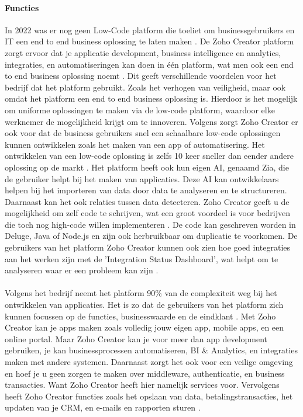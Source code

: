 \paragraph{Functies}
In 2022 was er nog geen Low-Code platform die toeliet om businessgebruikers en IT een end to end business oplossing te laten maken \autocite{Computer2022}.
De Zoho Creator platform zorgt ervoor dat je applicatie development, business intelligence en analytics, integraties, en automatiseringen kan doen in één platform, wat men ook een end to end business oplossing noemt \autocite{Computer2022}.
Dit geeft verschillende voordelen voor het bedrijf dat het platform gebruikt. Zoals het verhogen van veiligheid, maar ook omdat het platform een end to end business oplossing is. Hierdoor is het mogelijk om uniforme oplossingen te maken via de low-code platform,
waardoor elke werknemer de mogelijkheid krijgt om te innoveren. Volgens \textcite{Computer2022} zorgt Zoho Creator er ook voor dat de business gebruikers snel een schaalbare low-code oplossingen kunnen ontwikkelen zoals het maken van een app of automatisering.
Het ontwikkelen van een low-code oplossing is zelfs 10 keer sneller dan eender andere oplossing op de markt \autocite{Computer2022}. Het platform heeft ook hun eigen AI, genaamd Zia, die de gebruiker helpt bij het maken van applicaties. Deze AI
kan ontwikkelaars helpen bij het importeren van data door data te analyseren en te structureren. Daarnaast kan het ook relaties tussen data detecteren. 
Zoho Creator geeft u de mogelijkheid om zelf code te schrijven, wat een groot voordeel is voor bedrijven die toch nog high-code willen implementeren \autocite{Computer2022}. 
De code kan geschreven worden in Deluge, Java of Node.js en zijn ook herbruikbaar om duplicatie te voorkomen.
De gebruikers van het platform Zoho Creator kunnen ook zien hoe goed integraties aan het werken zijn met de 'Integration Status Dashboard', wat helpt om te analyseren waar er een probleem kan zijn \autocite{Computer2022}.
\\ %
\\
Volgens het bedrijf \textcite{ZohoCorporation2024b} neemt het platform 90\% van de complexiteit weg bij het ontwikkelen van applicaties. Het is zo dat de gebruikers van het platform
zich kunnen focussen op de functies, businesswaarde en de eindklant \autocite{ZohoCorporation2024b}.  Met Zoho Creator kan je apps maken zoals volledig jouw eigen app, mobile apps, en een online portal.
Maar Zoho Creator kan je voor meer dan app development gebruiken, je kan businessprocessen automatiseren, BI \& Analytics, en integraties maken met andere systemen. Daarnaast zorgt het ook voor een veilige omgeving en hoef je u geen zorgen 
te maken over middleware, authenticatie, en business transacties. Want Zoho Creator heeft hier namelijk services voor. Vervolgens heeft Zoho Creator functies zoals het opslaan van data,
betalingstransacties, het updaten van je CRM, en e-mails en rapporten sturen \autocite{ZohoCorporation2024b}.

